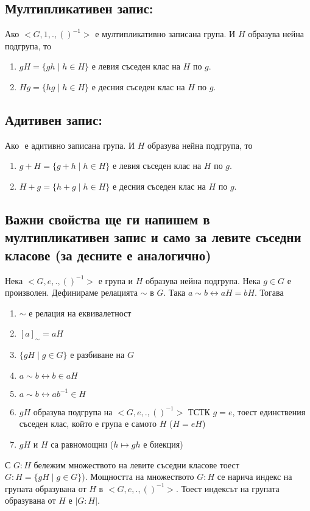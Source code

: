 \documentclass[12pt]{article}
\begin{document}
\subsection{Мултипликативен запис:}
Ако \(<G, 1, . , ()^{-1}>\) е мултипликативно записана група.
И \(H\) образува нейна подгрупа, то 
\begin{enumerate}
    \item \(gH = \{gh \; | \; h \in H\}\) е левия съседен клас на \(H\) по \(g\).
    \item \(Hg = \{hg \; | \; h \in H\}\) е десния съседен клас на \(H\) по \(g\).
\end{enumerate}
\subsection{Адитивен запис:}
Ако \(<G, 0, + , ->\) е адитивно записана група.
И \(H\) образува нейна подгрупа, то 
\begin{enumerate}
    \item \(g + H = \{g + h \; | \; h \in H\}\) е левия съседен клас на \(H\) по \(g\).
    \item \(H + g = \{h + g \; | \; h \in H\}\) е десния съседен клас на \(H\) по \(g\).
\end{enumerate}
\subsection{Важни свойства ще ги напишем в мултипликативен запис и само за левите съседни класове (за десните е аналогично)}
Нека \(<G, e, . , ()^{-1}>\) е група и \(H\) образува нейна подгрупа.
Нека \(g \in G\) е произволен.
Дефинираме релацията \(\sim\) в \(G\). Така \(a \sim b \longleftrightarrow aH = bH\). Тогава
\begin{enumerate}
    \item \(\sim\) е релация на еквивалетност
    \item \([a]_\sim = aH\)
    \item \(\{gH \; | \; g \in G\}\) е разбиване на \(G\)
    \item \(a \sim b \longleftrightarrow b \in aH\)
    \item \(a \sim b \longleftrightarrow ab^{-1} \in H\)
    \item \(gH\) образува подгрупа на \(<G, e, . , ()^{-1}>\) ТСТК \(g = e\),
    тоест единствения съседен клас, който е група е самото \(H\) (\(H = eH\))
    \item \(gH\) и \(H\) са равномощни (\(h \mapsto gh\) е биекция)
\end{enumerate}
С \(G : H\) бележим множеството на левите съседни класове тоест \(G : H = \{gH \; | \; g \in G\}\)). Мощността на множеството \(G : H\) се нарича индекс на групата образувана от \(H\) в \(<G, e, . , ()^{-1}>\). Тоест индексът на групата образувана от \(H\) е \(|G : H|\).
\end{document}
